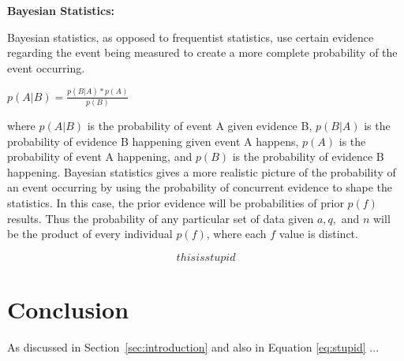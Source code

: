 \documentclass[]{report}
\begin{document}
\par \textbf{Bayesian Statistics:}
\par Bayesian statistics, as opposed to frequentist statistics, use certain evidence regarding the event being measured to create a more complete probability of the event occurring. \par \begin{center} $p(A|B) = \frac{p(B|A)*p(A)}{p(B)} $ \end{center}  \par where $p(A|B)$ is the probability of event A given evidence B, $p(B|A)$ is the probability of evidence B happening given event A happens, $p(A)$ is the probability of event A happening, and $p(B)$ is the probability of evidence B happening. Bayesian statistics gives a more realistic picture of the probability of an event occurring by using the probability of concurrent evidence to shape the statistics.  In this case, the prior evidence will be probabilities of prior $p(f)$ results. Thus the probability of any particular set of data given $a,q,$ and $n$ will be the product of every individual $p(f)$, where each $f$ value is distinct. 

\begin{equation}\label{eq:stupid}
    this is stupid
\end{equation}

\section{Conclusion}
As discussed in Section~\ref{sec:introduction} and also in Equation \ref{eq:stupid} ...
\end{document}
